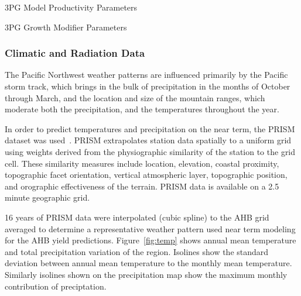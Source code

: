 \documentclass[preprint,12pt]{elsarticle}
\begin{document}
\begin{table}%
\caption{3PG Model Productivity Parameters}

\label{tab:3pg-tree-productivity}
 \end{table}

\begin{table}%
\caption{3PG Growth Modifier Parameters}

\label{tab:3pg-tree-modifiers}
 \end{table}

\subsubsection{Climatic and Radiation Data}
\label{sec:climate}


The Pacific Northwest weather patterns are influenced primarily by the
Pacific storm track, which brings in the bulk of precipitation in the
months of October through March, and the location and size of the
mountain ranges, which moderate both the precipitation, and the
temperatures throughout the year.

In order to predict temperatures and precipitation on the near term,
the \acf{PRISM} dataset was used~\cite{Daly2008a}.  \ac{PRISM}
extrapolates station data spatially to a uniform grid using weights
derived from the physiographic similarity of the station to the grid
cell. These similarity measures include location, elevation, coastal
proximity, topographic facet orientation, vertical atmospheric layer,
topographic position, and orographic effectiveness of the terrain.
\ac{PRISM} data is available on a 2.5 minute geographic grid.

16 years of \ac{PRISM} data were interpolated (cubic spline) to the
\ac{AHB} grid averaged to determine a representative weather pattern
used near term modeling for the \ac{AHB} yield predictions.
Figure~\ref{fig:temp} shows annual mean temperature and total
precipitation variation of the region.  Isolines show the standard
deviation between annual mean temperature to the monthly mean
temperature.  Similarly isolines shown on the precipitation map show
the maximum monthly contribution of preciptation.
\end{document}
